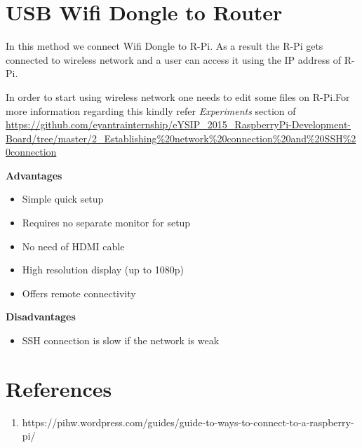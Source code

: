 \documentclass[11pt,a4paper]{article}
\begin{document}
	    \section{USB Wifi Dongle to Router}
	    
	    In this method we connect Wifi Dongle to R-Pi. As a result the R-Pi gets connected to wireless network and a user can access it using the IP address of R-Pi.
	    
	    In order to start using wireless network one needs to edit some files on R-Pi.For more information regarding this kindly refer \textit{Experiments} section of  \url{https://github.com/eyantrainternship/eYSIP_2015_RaspberryPi-Development-Board/tree/master/2_Establishing%20network%20connection%20and%20SSH%20connection}
	    
	    \vspace{0.3cm}	
	    \textbf{Advantages}
	    \begin{itemize}
	    	\item Simple quick setup
	    	\item Requires no separate monitor for setup
	    	\item No need of HDMI cable
		    \item High resolution display (up to 1080p)
		    \item Offers remote connectivity
	    \end{itemize}
	    
	    \textbf{Disadvantages}
	    \begin{itemize}
	    	\item SSH connection is slow if the network is weak 
	    \end{itemize}
	    
	    
	
	\vspace{0.5cm}
	\section{References}
	\begin{enumerate}
		\item https://pihw.wordpress.com/guides/guide-to-ways-to-connect-to-a-raspberry-pi/
	\end{enumerate}
\end{document}
